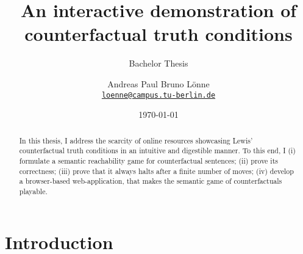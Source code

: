 \documentclass[a4paper,american]{paper}
\date{\today}
\providecommand*{\code}[1]{\texttt{#1}}
\theoremstyle{definition}\newtheorem{definition}{Definition}
\begin{document}
\title{An interactive demonstration of counterfactual truth conditions}

\subtitle{Bachelor Thesis}

\author{%
	Andreas Paul Bruno Lönne\\
	\code{\href{mailto:loenne@campus.tu-berlin.de}{loenne@campus.tu-berlin.de}}
}


\maketitle

\begin{abstract}
In this thesis, I address the scarcity of online resources showcasing Lewis' counterfactual truth conditions in an intuitive and digestible manner. To this end, I (i) formulate a semantic reachability game for counterfactual sentences; (ii) prove its correctness; (iii) prove that it always halts after a finite number of moves; (iv) develop a browser-based web-application, that makes the semantic game of counterfactuals playable.
\end{abstract}
\section{Introduction}
\end{document}
